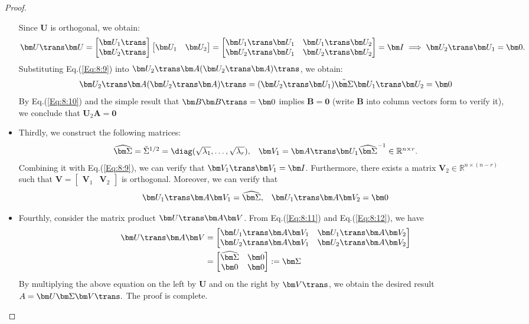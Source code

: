 \begin{proof}
\begin{itemize}
Since $\bm U$ is orthogonal, we obtain:
\[
\bm U\trans\bm U=\begin{bmatrix}
\bm U_1\trans\\\bm U_2\trans
\end{bmatrix}\begin{bmatrix}
\bm U_1&\bm U_2
\end{bmatrix}=\begin{bmatrix}
\bm U_1\trans\bm U_1&\bm U_1\trans\bm U_2\\
\bm U_2\trans\bm U_1&\bm U_2\trans\bm U_2
\end{bmatrix}=\bm I\implies
\bm U_2\trans\bm U_1=\bm0.
\]
Substituting Eq.(\ref{Eq:8:9}) into $\bm U_2\trans\bm A(\bm U_2\trans\bm A)\trans$, we obtain:
\begin{equation}
\bm U_2\trans\bm A(\bm U_2\trans\bm A)\trans
=(\bm U_2\trans\bm U_1)\tilde{\bm\Sigma}\bm U_1\trans\bm U_2=\bm0\label{Eq:8:10}
\end{equation}
By Eq.(\ref{Eq:8:10}) and the simple result that $\bm B\bm B\trans=\bm0$ implies $\bm B=\bm0$ (write $\bm B$ into column vectors form to verify it), we conclude that $\bm U_2\bm A=\bm0$
\item
Thirdly, we construct the following matrices:
\[
\begin{array}{ll}
\widehat{\bm\Sigma}=\tilde{\Sigma}^{1/2}=\diag(\sqrt{\lambda_1},\dots,\sqrt{\lambda_r}),
&
\bm V_1=\bm A\trans\bm U_1\widehat{\bm\Sigma}^{-1}\in\mathbb{R}^{n\times r}.
\end{array}
\]
Combining it with Eq.(\ref{Eq:8:9}), we can verify that $\bm V_1\trans\bm V_1=\bm I$. Furthermore, there exists a matrix $\bm V_2\in\mathbb{R}^{n\times (n-r)}$ such that $\bm V=\begin{bmatrix}
\bm V_1&\bm V_2
\end{bmatrix}$ is orthogonal. Moreover, we can verify that
\begin{equation}\label{Eq:8:11}
\begin{array}{ll}
\bm U_1\trans\bm A\bm V_1=\widehat{\bm\Sigma},
&
\bm U_1\trans\bm A\bm V_2=\bm0
\end{array}
\end{equation}
\item
Fourthly, consider the matrix product $\bm U\trans\bm A\bm V$. From Eq.(\ref{Eq:8:11}) and Eq.(\ref{Eq:8:12}), we have
\begin{align*}
\bm U\trans\bm A\bm V&=\begin{bmatrix}
\bm U_1\trans\bm A\bm V_1&
\bm U_1\trans\bm A\bm V_2
\\
\bm U_2\trans\bm A\bm V_1
&
\bm U_2\trans\bm A\bm V_2
\end{bmatrix}\\&=\begin{bmatrix}
\widehat{\bm\Sigma}&\bm0\\\bm0&\bm0
\end{bmatrix}:=\bm\Sigma
\end{align*}
By multiplying the above equation on the left by $\bm U$ and on the
right by $\bm V\trans$, we obtain the desired result $A = \bm U\bm\Sigma\bm V\trans.$ The proof is complete.
\end{itemize}
\end{proof}

